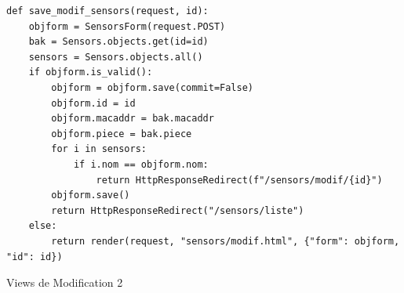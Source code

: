 \documentclass{article}
\begin{document}
\begin{listing}[H]
    \begin{verbatim}
def save_modif_sensors(request, id):
    objform = SensorsForm(request.POST)
    bak = Sensors.objects.get(id=id)
    sensors = Sensors.objects.all()
    if objform.is_valid():
        objform = objform.save(commit=False)
        objform.id = id
        objform.macaddr = bak.macaddr
        objform.piece = bak.piece
        for i in sensors:
            if i.nom == objform.nom:
                return HttpResponseRedirect(f"/sensors/modif/{id}")
        objform.save()
        return HttpResponseRedirect("/sensors/liste")
    else:
        return render(request, "sensors/modif.html", {"form": objform, "id": id})
    \end{verbatim}
    \caption{Views de Modification 2}
    \label{django:views:modif2}
\end{listing}
\end{document}
